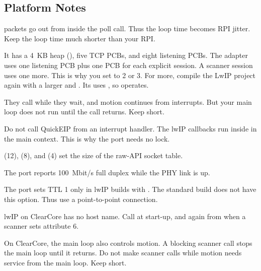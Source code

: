 \subsection{Platform Notes}

\begin{description}[font=\sffamily\bfseries\color{steel}]
  \item[Call \code{eip_adapter_poll} frequently.] \TO{} packets go out from
        inside the poll call. Thus the loop time becomes RPI jitter. Keep the
        loop time much shorter than your RPI.
  \item[The lwIP build is small.] It has a 4~KB heap (), five
        TCP PCBs, and eight listening PCBs. The adapter uses one listening PCB
        plus one PCB for each explicit session. A scanner session uses one
        more. This is why you set  to 2 or 3. For
        more, compile the LwIP project again with a larger  and
        . Its  uses ,
        so  operates.
  \item[Blocking scanner calls.] They call  while
        they wait, and motion continues from interrupts. But your main loop
        does not run until the call returns. Keep  short.
  \item[Interrupts.] Do not call QuickEIP from an interrupt handler. The lwIP
        callbacks run inside  in the main context.
        This is why the port needs no lock.
  \item[Socket table.]  (12),
         (8), and  (4) set
        the size of the raw-API socket table.
  \item[Link report.] The port reports 100~Mbit/s full duplex while the PHY
        link is up.
  \item[Multicast \TO.] The port sets TTL 1 only in lwIP builds with
        . The standard build does not have
        this option. Thus use a point-to-point connection.
  \item[Host name.] lwIP on ClearCore has no host name. Call
         at start-up, and again from
         when a scanner sets attribute 6.
\end{description}

\begin{warning}
On ClearCore, the main loop also controls motion. A blocking scanner call
stops the main loop until it returns. Do not make scanner calls while motion
needs service from the main loop. Keep  short.
\end{warning}

